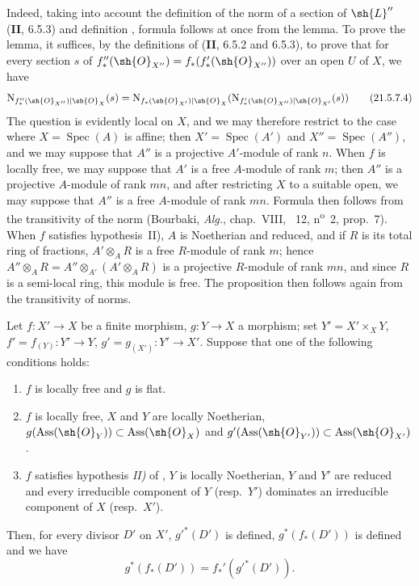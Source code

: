 Indeed, taking into account the definition of the norm of a section of $\sh{L}''$ (\textbf{II}, 6.5.3) and definition , formula  follows at once from the lemma.
To prove the lemma, it suffices, by the definitions of (\textbf{II}, 6.5.2 and 6.5.3), to prove that for every section $s$ of $f_*''(\sh{O}_{X''})=f_*(f_*'(\sh{O}_{X''}))$ over an open $U$ of $X$, we have
\[
\label{IV.21.5.7.4}
  \mathrm{N}_{f_*''(\sh{O}_{X''})|\sh{O}_X}(s)=\mathrm{N}_{f_*(\sh{O}_{X'})|\sh{O}_X}(\mathrm{N}_{f_*'(\sh{O}_{X''})|\sh{O}_{X'}}(s))
  \tag{21.5.7.4}
\]
The question is evidently local on $X$, and we may therefore restrict to the case where $X=\operatorname{Spec}(A)$ is affine;
then $X'=\operatorname{Spec}(A')$ and $X''=\operatorname{Spec}(A'')$, and we may suppose that $A''$ is a projective $A'$-module of rank $n$.
When $f$ is locally free, we may suppose that $A'$ is a free $A$-module of rank $m$;
then $A''$ is a projective $A$-module of rank $mn$, and after restricting $X$ to a suitable open, we may suppose that $A''$ is a free $A$-module of rank $mn$.
Formula  then follows from the transitivity of the norm (Bourbaki, \emph{Alg.}, chap.~VIII, \textsection~12, n\textsuperscript{o}~2, prop.~7).
When $f$ satisfies hypothesis~II), $A$ is Noetherian and reduced, and if $R$ is its total ring of fractions, $A'\otimes_A R$ is a free $R$-module of rank $m$;
hence $A''\otimes_A R=A''\otimes_{A'}(A'\otimes_A R)$ is a projective $R$-module of rank $mn$, and since $R$ is a semi-local ring, this module is free.
The proposition then follows again from the transitivity of norms.

\begin{proposition}[21.5.8]
\label{IV.21.5.8}
Let $f:X'\to X$ be a finite morphism, $g:Y\to X$ a morphism;
set $Y'=X'\times_XY$, $f'=f_{(Y)}:Y'\to Y$, $g'=g_{(X')}:Y'\to X'$.
Suppose that one of the following conditions holds:
\begin{enumerate}[label=(\roman*)]
  \item $f$ is locally free and $g$ is flat.
  \item $f$ is locally free, $X$ and $Y$ are locally Noetherian, $g(\operatorname{Ass}(\sh{O}_Y))\subset\operatorname{Ass}(\sh{O}_X)$ and $g'(\operatorname{Ass}(\sh{O}_{Y'}))\subset\operatorname{Ass}(\sh{O}_{X'})$.
  \item $f$ satisfies hypothesis \emph{II)} of , $Y$ is locally Noetherian, $Y$ and $Y'$ are reduced and every irreducible component of $Y$ (resp.\ $Y'$) dominates an irreducible component of $X$ (resp.\ $X'$).
\end{enumerate}
Then, for every divisor $D'$ on $X'$, $g'^*(D')$ is defined, $g^*(f_*(D'))$ is defined and we have
\[
\label{IV.21.5.8.1}
  g^*(f_*(D'))=f_*'(g'^*(D')).
  \tag{21.5.8.1}
\]
\end{proposition}

